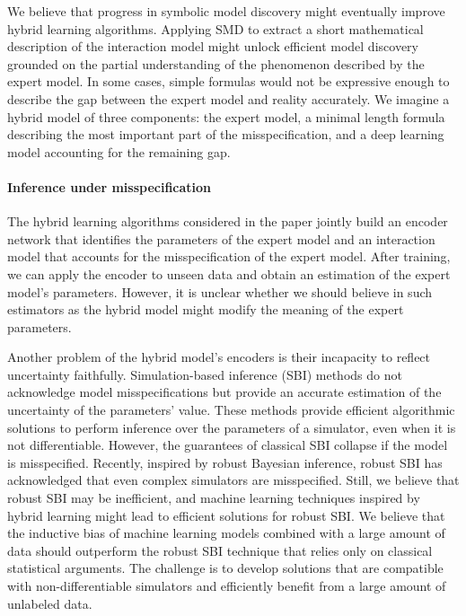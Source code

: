 We believe that progress in symbolic model discovery might eventually improve hybrid learning algorithms. Applying SMD to extract a short mathematical description of the interaction model might unlock efficient model discovery grounded on the partial understanding of the phenomenon described by the expert model. In some cases, simple formulas would not be expressive enough to describe the gap between the expert model and reality accurately. We imagine a hybrid model of three components: the expert model, a minimal length formula describing the most important part of the misspecification, and a deep learning model accounting for the remaining gap.

\paragraph{Inference under misspecification}
The hybrid learning algorithms considered in the paper jointly build an encoder network that identifies the parameters of the expert model and an interaction model that accounts for the misspecification of the expert model. After training, we can apply the encoder to unseen data and obtain an estimation of the expert model's parameters. However, it is unclear whether we should believe in such estimators as the hybrid model might modify the meaning of the expert parameters.

Another problem of the hybrid model's encoders is their incapacity to reflect uncertainty faithfully. Simulation-based inference (SBI) methods do not acknowledge model misspecifications but provide an accurate estimation of the uncertainty of the parameters' value. These methods provide efficient algorithmic solutions to perform inference over the parameters of a simulator, even when it is not differentiable. However, the guarantees of classical SBI collapse if the model is misspecified. Recently, inspired by robust Bayesian inference, robust SBI has acknowledged that even complex simulators are misspecified. Still, we believe that robust SBI may be inefficient, and machine learning techniques inspired by hybrid learning might lead to efficient solutions for robust SBI. We believe that the inductive bias of machine learning models combined with a large amount of data should outperform the robust SBI technique that relies only on classical statistical arguments. The challenge is to develop solutions that are compatible with non-differentiable simulators and efficiently benefit from a large amount of unlabeled data.

